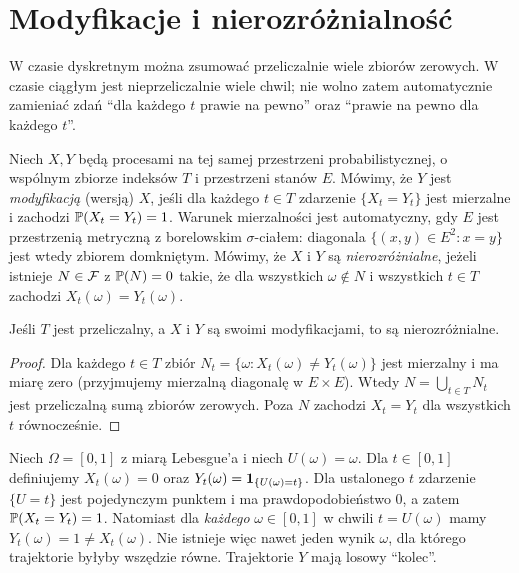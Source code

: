 \section{Modyfikacje i nierozróżnialność}
W czasie dyskretnym można zsumować przeliczalnie wiele zbiorów
zerowych. W czasie ciągłym jest nieprzeliczalnie wiele chwil;
nie wolno zatem automatycznie zamieniać zdań ``dla każdego $t$
prawie na pewno'' oraz ``prawie na pewno dla każdego $t$''.

\begin{definicja}
Niech $X,Y$ będą procesami na tej samej przestrzeni probabilistycznej,
o wspólnym zbiorze indeksów $T$ i przestrzeni stanów $E$.
Mówimy, że $Y$ jest \emph{modyfikacją} (wersją) $X$, jeśli
dla każdego $t\in T$ zdarzenie $\{X_t=Y_t\}$ jest mierzalne
i zachodzi $\mathbb{P}(X_t=Y_t)=1$.
Warunek mierzalności jest automatyczny, gdy $E$ jest przestrzenią
metryczną z borelowskim $\sigma$-ciałem: diagonala
$\{(x,y)\in E^2:x=y\}$ jest wtedy zbiorem domkniętym.
Mówimy, że $X$ i $Y$ są \emph{nierozróżnialne}, jeżeli istnieje
$N\in\mathcal{F}$ z $\mathbb{P}(N)=0$ takie, że dla wszystkich
$\omega\notin N$ i wszystkich $t\in T$ zachodzi
$X_t(\omega)=Y_t(\omega)$.
\end{definicja}

\begin{stwierdzenie}
Jeśli $T$ jest przeliczalny, a $X$ i $Y$ są swoimi
modyfikacjami, to są nierozróżnialne.
\end{stwierdzenie}
\begin{proof}
Dla każdego $t\in T$ zbiór
$N_t=\{\omega:X_t(\omega)\ne Y_t(\omega)\}$ jest mierzalny
i ma miarę zero (przyjmujemy mierzalną diagonalę w $E\times E$).
Wtedy $N=\bigcup_{t\in T}N_t$ jest przeliczalną sumą
zbiorów zerowych. Poza $N$ zachodzi $X_t=Y_t$ dla
wszystkich $t$ równocześnie.
\end{proof}

\begin{przyklad}
Niech $\Omega=[0,1]$ z miarą Lebesgue'a i niech
$U(\omega)=\omega$. Dla $t\in[0,1]$ definiujemy
$X_t(\omega)=0$ oraz $Y_t(\omega)=\mathbf{1}_{\{U(\omega)=t\}}$.
Dla ustalonego $t$ zdarzenie $\{U=t\}$ jest pojedynczym
punktem i ma prawdopodobieństwo $0$, a zatem
$\mathbb{P}(X_t=Y_t)=1$. Natomiast dla \emph{każdego}
$\omega\in[0,1]$ w chwili $t=U(\omega)$ mamy
$Y_t(\omega)=1\ne X_t(\omega)$. Nie istnieje więc
nawet jeden wynik $\omega$, dla którego trajektorie byłyby
wszędzie równe. Trajektorie $Y$ mają losowy ``kolec''.
\end{przyklad}


